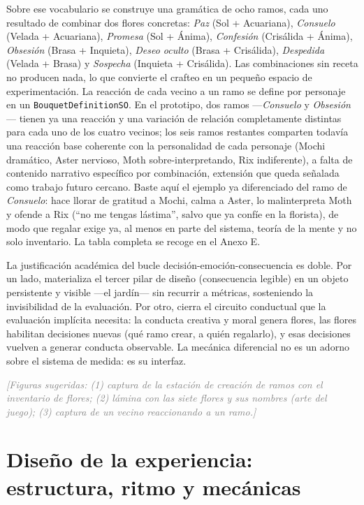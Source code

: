 \documentclass[12pt,twoside,titlepage]{report}
\begin{document}
Sobre ese vocabulario se construye una gramática de ocho ramos, cada uno resultado de combinar dos flores concretas: \textit{Paz} (Sol + Acuariana), \textit{Consuelo} (Velada + Acuariana), \textit{Promesa} (Sol + Ánima), \textit{Confesión} (Crisálida + Ánima), \textit{Obsesión} (Brasa + Inquieta), \textit{Deseo oculto} (Brasa + Crisálida), \textit{Despedida} (Velada + Brasa) y \textit{Sospecha} (Inquieta + Crisálida). Las combinaciones sin receta no producen nada, lo que convierte el crafteo en un pequeño espacio de experimentación. La reacción de cada vecino a un ramo se define por personaje en un \texttt{BouquetDefinitionSO}. En el prototipo, dos ramos ---\textit{Consuelo} y \textit{Obsesión}--- tienen ya una reacción y una variación de relación completamente distintas para cada uno de los cuatro vecinos; los seis ramos restantes comparten todavía una reacción base coherente con la personalidad de cada personaje (Mochi dramático, Aster nervioso, Moth sobre-interpretando, Rix indiferente), a falta de contenido narrativo específico por combinación, extensión que queda señalada como trabajo futuro cercano. Baste aquí el ejemplo ya diferenciado del ramo de \textit{Consuelo}: hace llorar de gratitud a Mochi, calma a Aster, lo malinterpreta Moth y ofende a Rix (``no me tengas lástima'', salvo que ya confíe en la florista), de modo que regalar exige ya, al menos en parte del sistema, teoría de la mente y no solo inventario. La tabla completa se recoge en el Anexo E.

La justificación académica del bucle decisión-emoción-consecuencia es doble. Por un lado, materializa el tercer pilar de diseño (consecuencia legible) en un objeto persistente y visible ---el jardín--- sin recurrir a métricas, sosteniendo la invisibilidad de la evaluación. Por otro, cierra el circuito conductual que la evaluación implícita necesita: la conducta creativa y moral genera flores, las flores habilitan decisiones nuevas (qué ramo crear, a quién regalarlo), y esas decisiones vuelven a generar conducta observable. La mecánica diferencial no es un adorno sobre el sistema de medida: es su interfaz.

\textcolor{gray}{\textit{[Figuras sugeridas: (1) captura de la estación de creación de ramos con el inventario de flores; (2) lámina con las siete flores y sus nombres (arte del juego); (3) captura de un vecino reaccionando a un ramo.]}}


\section{Diseño de la experiencia: estructura, ritmo y mecánicas}
\end{document}
